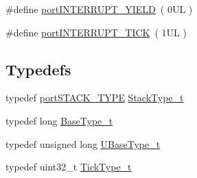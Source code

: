 \begin{DoxyCompactItemize}
\item 
\#define \hyperlink{MSVC-MingW_2portmacro_8h_ae86b9ac3969c84a0e5db6d2debeba7cb}{port\-I\-N\-T\-E\-R\-R\-U\-P\-T\-\_\-\-Y\-I\-E\-L\-D}~( 0\-U\-L )
\item 
\#define \hyperlink{MSVC-MingW_2portmacro_8h_a6be5f7ce924302129a4184caf180a607}{port\-I\-N\-T\-E\-R\-R\-U\-P\-T\-\_\-\-T\-I\-C\-K}~( 1\-U\-L )
\end{DoxyCompactItemize}
\subsection*{Typedefs}
\begin{DoxyCompactItemize}
\item 
typedef \hyperlink{WizC_2PIC18_2portmacro_8h_ab0a294066ac7369b8f59a52d9491a92c}{port\-S\-T\-A\-C\-K\-\_\-\-T\-Y\-P\-E} \hyperlink{MSVC-MingW_2portmacro_8h_a84e9a8ba132feed0b2401c1f4e2ac63c}{Stack\-Type\-\_\-t}
\item 
typedef long \hyperlink{MSVC-MingW_2portmacro_8h_a46fb21e00ae0729d7515c0fbf2269796}{Base\-Type\-\_\-t}
\item 
typedef unsigned long \hyperlink{MSVC-MingW_2portmacro_8h_a646f89d4298e4f5afd522202b11cb2e6}{U\-Base\-Type\-\_\-t}
\item 
typedef uint32\-\_\-t \hyperlink{MSVC-MingW_2portmacro_8h_aa69c48c6e902ce54f70886e6573c92a9}{Tick\-Type\-\_\-t}
\end{DoxyCompactItemize}
